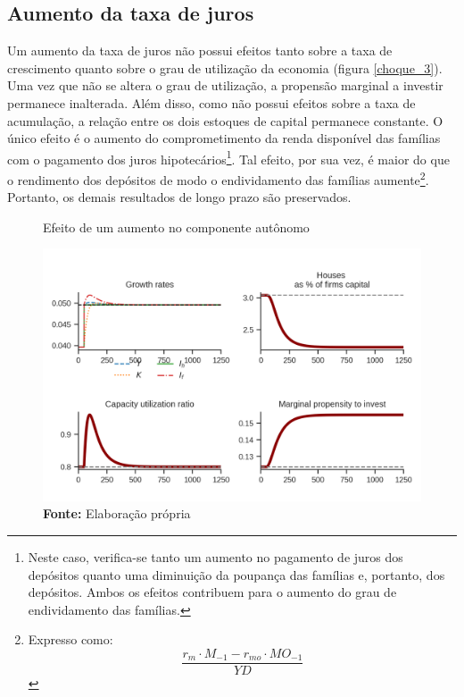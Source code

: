 \subsection{Aumento da taxa de juros}

Um aumento da taxa de juros não possui efeitos tanto sobre a taxa de crescimento quanto sobre o grau de utilização da economia (figura \ref{choque_3}). Uma vez que não se altera o grau de utilização, a propensão marginal a investir permanece inalterada. Além disso, como não possui efeitos sobre a taxa de acumulação, 
a relação entre os dois estoques de capital permanece constante. O único efeito é o aumento do comprometimento da renda disponível das famílias com o pagamento dos juros hipotecários\footnote{Neste caso, verifica-se tanto um aumento no pagamento de juros dos depósitos quanto uma diminuição da poupança das famílias e, portanto, dos depósitos. Ambos os efeitos contribuem para o aumento do grau de endividamento das famílias.}. Tal efeito, por sua vez, é maior do que o rendimento dos depósitos de modo o endividamento das famílias aumente\footnote{Expresso como:
$$
\frac{r_m\cdot M_{-1} - r_{mo}\cdot MO_{-1}}{YD}
$$
}. Portanto, os demais resultados de longo prazo são preservados.


\begin{figure}[htb]
    \centering
    \label{choque_1}
    \caption{Efeito de um aumento no componente autônomo}
    \includegraphics{../../Modelo/Versoes/Shock_1.png}
    \caption*{\textbf{Fonte:} Elaboração própria}
\end{figure}


